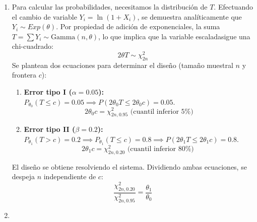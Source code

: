 \begin{enumerate}[label=\color{red}\textbf{\arabic*)}]
\begin{enumerate}[label=\color{red}\textbf{\alph*)}]
		            Por el Lema de Neyman-Pearson, el test de región de rechazo de máxima potencia es: \[
			            S_1=\left\{ \mathbf{x}\bigg|\dfrac{L(\mathbf{x},\theta_1)}{L(\mathbf{x},\theta_0)}\ge k \right\}
		            \]
		            Sustituimos la verosimilitud en el cociente: \[
			            \dfrac{\theta_1^n\exp(-(\theta_1+1)T(\mathbf{x}))}{\theta_0^n\exp(-(\theta_0+1)T(\mathbf{x}))}=\left( \dfrac{\theta_1}{\theta_0} \right)^n\exp(-(\theta_1-\theta_0)T(\mathbf{x}))\ge k
		            \]
		            Tomando logaritmos y operando: \[
			            n\ln\left( \dfrac{\theta_1}{\theta_0} \right) -(\theta_1-\theta_0)T(\mathbf{x})\ge \ln(k)
		            \]
		            Dado que la condición del enunciado establece $\theta_0<\theta_1$, el término $(\theta_1-\theta_0)$ es positivo. Al despejar $T(\mathbf{x})$, el signo de la inecuación se invierte: \[
			            T(\mathbf{x})\le \dfrac{n\ln(\theta_1 / \theta_0)-\ln(k)}{\theta_1-\theta_0}=c
		            \]
		            Por tanto, la región crítica queda expresada matemáticamente como: \[
			            S_1=\left\{ \mathbf{x}\bigg|\sum_{i=1}^{n} \ln(1+x_{i})\le c \right\}
		            \]
		            Con extensión $\alpha:\,P_{\theta_0}\left( \sum_{i=1}^{n} \ln(1+X_i)\le c \right)=\alpha$.
		      \item {}

		            Para calcular las probabilidades, necesitamos la distribución de $T$. Efectuando el cambio de variable  $Y_i=\ln(1+X_i)$, se demuestra analíticamente que $Y_i\sim Exp(\theta)$. Por propiedad de adición de exponenciales, la suma $T=\sum Y_i\sim \mathrm{Gamma}(n,\theta)$, lo que implica que la variable escaladasigue una chi-cuadrado: \[
			            2\theta T\sim \chi_{2n}^2
		            \]
		            Se plantean dos ecuaciones para determinar el diseño (tamaño muestral $n$ y frontera  $c$):
		            \begin{enumerate}[label=\arabic*)]
			            \item \textbf{Error tipo I ($\alpha=0.05$):} $P_{\theta_0}(T\le c)=0.05\implies P(2\theta_0T\le 2\theta_0c)=0.05$. \[
				                  2\theta_0c=\chi_{2n,0.95}^2\text{ (cuantil inferior 5\%)}
			                  \]
			            \item \textbf{Error tipo II ($\beta=0.2$):} $P_{\theta_1}(T>c)=0.2\implies P_{\theta_1}(T\le c)=0.8\implies P(2\theta_1 T\le 2\theta_1c)=0.8$. \[
				                  2\theta_1c=\chi_{2n,0.20}^2\text{ (cuantil inferior 80\%) }
			                  \]
		            \end{enumerate}
		            El diseño se obtiene resolviendo el sistema. Dividiendo ambas ecuaciones, se despeja $n$ independiente de $c$:  \[
			            \dfrac{\chi_{2n,0.20}^2}{\chi_{2n,0.95}^2}=\dfrac{\theta_1}{\theta_0}
		            \]
		      \item {}


\end{enumerate}
\end{enumerate}
